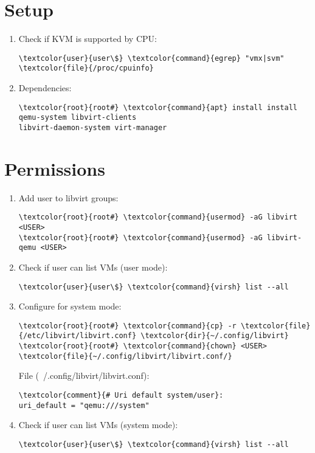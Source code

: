 \documentclass[10pt, a4paper, onecolumn, openany]{book} %
\begin{document}
\section{Setup}
\begin{enumerate}
    \item Check if KVM is supported by CPU:
\begin{Verbatim}[commandchars=\\\{\}]
\textcolor{user}{user\$} \textcolor{command}{egrep} "vmx|svm" \textcolor{file}{/proc/cpuinfo}
\end{Verbatim}
    \item Dependencies:
\begin{Verbatim}[commandchars=\\\{\}]
\textcolor{root}{root#} \textcolor{command}{apt} install install qemu-system libvirt-clients 
libvirt-daemon-system virt-manager
\end{Verbatim}
\end{enumerate}
\section{Permissions}
\begin{enumerate}
    \item Add user to libvirt groups:
\begin{Verbatim}[commandchars=\\\{\}]
\textcolor{root}{root#} \textcolor{command}{usermod} -aG libvirt <USER>
\textcolor{root}{root#} \textcolor{command}{usermod} -aG libvirt-qemu <USER>
\end{Verbatim}
    \item Check if user can list VMs (user mode):
\begin{Verbatim}[commandchars=\\\{\}]
\textcolor{user}{user\$} \textcolor{command}{virsh} list --all
\end{Verbatim}
    \item Configure for system mode:
\begin{Verbatim}[commandchars=\\\{\}]
\textcolor{root}{root#} \textcolor{command}{cp} -r \textcolor{file}{/etc/libvirt/libvirt.conf} \textcolor{dir}{~/.config/libvirt}
\textcolor{root}{root#} \textcolor{command}{chown} <USER> \textcolor{file}{~/.config/libvirt/libvirt.conf/}
\end{Verbatim}
File (\textcolor{file}{~/.config/libvirt/libvirt.conf}):
\begin{Verbatim}[commandchars=\\\{\}]
\textcolor{comment}{# Uri default system/user}:
uri_default = "qemu:///system"
\end{Verbatim}
    \item Check if user can list VMs (system mode):
\begin{Verbatim}[commandchars=\\\{\}]
\textcolor{user}{user\$} \textcolor{command}{virsh} list --all
\end{Verbatim}
\end{enumerate}
\end{document}
